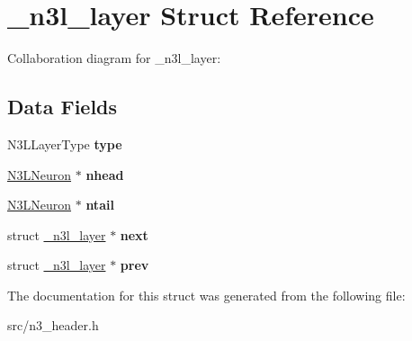 \hypertarget{struct__n3l__layer}{}\section{\+\_\+n3l\+\_\+layer Struct Reference}
\label{struct__n3l__layer}


Collaboration diagram for \+\_\+n3l\+\_\+layer\+:
\subsection*{Data Fields}
\begin{DoxyCompactItemize}
\item 
\mbox{\label{struct__n3l__layer_aec180f7f12ea86bb622c364076dbf1f6}} 
N3\+L\+Layer\+Type {\bfseries type}
\item 
\mbox{\label{struct__n3l__layer_a263e7831428a3b535964412a1d802c4e}} 
\mbox{\hyperlink{struct__n3l__neuron}{N3\+L\+Neuron}} $\ast$ {\bfseries nhead}
\item 
\mbox{\label{struct__n3l__layer_aa120fe4ab0898e733b8d6940b467ebc3}} 
\mbox{\hyperlink{struct__n3l__neuron}{N3\+L\+Neuron}} $\ast$ {\bfseries ntail}
\item 
\mbox{\label{struct__n3l__layer_afada0fe8b2a403d5aeeb71b0ae7f8aae}} 
struct \mbox{\hyperlink{struct__n3l__layer}{\+\_\+n3l\+\_\+layer}} $\ast$ {\bfseries next}
\item 
\mbox{\label{struct__n3l__layer_aedfd507c2c60e3b64234b8cd8570e6c9}} 
struct \mbox{\hyperlink{struct__n3l__layer}{\+\_\+n3l\+\_\+layer}} $\ast$ {\bfseries prev}
\end{DoxyCompactItemize}


The documentation for this struct was generated from the following file\+:\begin{DoxyCompactItemize}
\item 
src/n3\+\_\+header.\+h\end{DoxyCompactItemize}
